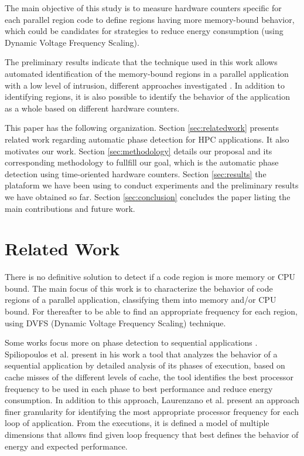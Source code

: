 \documentclass[conference,letter,10pt,final]{IEEEtran}
\begin{document}
The main objective of this study is to measure hardware counters
specific for each parallel region code to define regions
having more memory-bound behavior, which could be
candidates for strategies to reduce energy consumption (using
Dynamic Voltage Frequency Scaling).

The preliminary results indicate that the technique used in this work
allows automated identification of the memory-bound regions in a
parallel application with a low level of intrusion, different
approaches investigated \cite{freeh2005exploring,millani2006fr}. In
addition to identifying regions, it is also possible to identify the
behavior of the application as a whole based on different hardware
counters.  


This paper has the following
organization. Section \ref{sec:relatedwork} presents related work
regarding automatic phase detection for HPC applications. It also
motivates our work. Section \ref{sec:methodology} details our proposal
and its corresponding methodology to fullfill our goal, which is the
automatic phase detection using time-oriented hardware
counters. Section \ref{sec:results} the plataform we have been using
to conduct experiments and the preliminary results we have obtained so
far. Section \ref{sec:conclusion} concludes the paper listing the main
contributions and future work.   

\section{Related Work}
\label{sec:orgheadline2}
\label{sec:relatedwork}


There is no definitive solution to detect if a code region is more
memory or CPU bound. The main focus of this work is to characterize
the behavior of code regions of a parallel application, classifying
them into memory and/or CPU bound. For thereafter to be able to find
an appropriate frequency for each region, using DVFS (Dynamic Voltage
Frequency Scaling) technique.

Some works focus more on phase detection to sequential applications
\cite{spiliopoulos2012power}\cite{laurenzano2011reducing}. Spiliopoulos
et al.\cite{spiliopoulos2012power} present in his work a tool that
analyzes the behavior of a sequential application by detailed analysis
of its phases of execution, based on cache misses of the different
levels of cache, the tool identifies the best processor frequency to
be used in each phase to best performance and reduce energy
consumption. In addition to this approach, Laurenzano et
al.\cite{laurenzano2011reducing} present an approach finer granularity
for identifying the most appropriate processor frequency for each loop
of application. From the executions, it is defined a model of multiple
dimensions that allows find given loop frequency that best defines the
behavior of energy and expected performance. 
\end{document}
